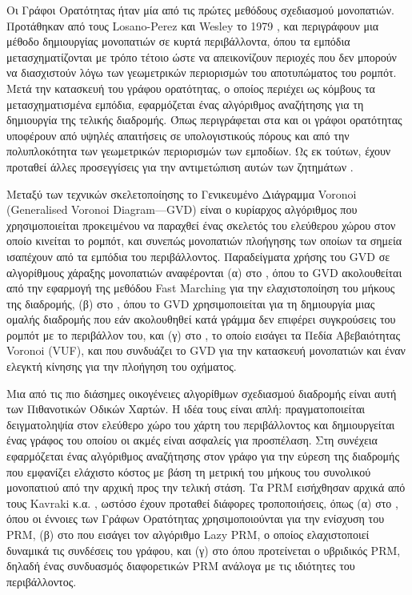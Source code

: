 Οι Γράφοι Ορατότητας ήταν μία από τις πρώτες μεθόδους σχεδιασμού μονοπατιών.
Προτάθηκαν από τους Losano-Perez και Wesley το 1979 \cite{Lozano-Perez1979},
και περιγράφουν μια μέθοδο δημιουργίας μονοπατιών σε κυρτά περιβάλλοντα, όπου
τα εμπόδια μετασχηματίζονται με τρόπο τέτοιο ώστε να απεικονίζουν περιοχές που
δεν μπορούν να διασχιστούν λόγω των γεωμετρικών περιορισμών του αποτυπώματος
του ρομπότ. Μετά την κατασκευή του γράφου ορατότητας, ο οποίος περιέχει ως
κόμβους τα μετασχηματισμένα εμπόδια, εφαρμόζεται ένας αλγόριθμος αναζήτησης για
τη δημιουργία της τελικής διαδρομής. Όπως περιγράφεται στα \cite{Ghosh2007} και
\cite{Ghosh2013} οι γράφοι ορατότητας υποφέρουν από υψηλές απαιτήσεις σε
υπολογιστικούς πόρους και από την πολυπλοκότητα των γεωμετρικών περιορισμών των
εμποδίων. Ως εκ τούτων, έχουν προταθεί άλλες προσεγγίσεις για την αντιμετώπιση
αυτών των ζητημάτων \cite{Kim2011}.

Μεταξύ των τεχνικών σκελετοποίησης το Γενικευμένο Διάγραμμα Voronoi
(Generalised Voronoi Diagram---GVD) είναι ο κυρίαρχος αλγόριθμος που
χρησιμοποιείται προκειμένου να παραχθεί ένας σκελετός του ελεύθερου χώρου στον
οποίο κινείται το ρομπότ, και συνεπώς μονοπατιών πλοήγησης των οποίων τα σημεία
ισαπέχουν από τα εμπόδια του περιβάλλοντος. Παραδείγματα χρήσης του GVD σε
αλγορίθμους χάραξης μονοπατιών αναφέρονται (α) στο \cite{Garrido2006}, όπου το
GVD ακολουθείται από την εφαρμογή της μεθόδου Fast Marching για την
ελαχιστοποίηση του μήκους της διαδρομής, (β) στο \cite{Bhattacharya2007}, όπου
το GVD χρησιμοποιείται για τη δημιουργία μιας ομαλής διαδρομής που εάν
ακολουθηθεί κατά γράμμα δεν επιφέρει συγκρούσεις του ρομπότ με το περιβάλλον
του, και (γ) στο \cite{Ok2013}, το οποίο εισάγει τα Πεδία Αβεβαιότητας Voronoi
(VUF), και που συνδυάζει το GVD για την κατασκευή μονοπατιών και έναν ελεγκτή
κίνησης για την πλοήγηση του οχήματος.

Μια από τις πιο διάσημες οικογένειες αλγορίθμων σχεδιασμού διαδρομής είναι αυτή
των Πιθανοτικών Οδικών Χαρτών. Η ιδέα τους είναι απλή: πραγματοποιείται
δειγματοληψία στον ελεύθερο χώρο του χάρτη του περιβάλλοντος και δημιουργείται
ένας γράφος του οποίου οι ακμές είναι ασφαλείς για προσπέλαση. Στη συνέχεια
εφαρμόζεται ένας αλγόριθμος αναζήτησης στον γράφο για την εύρεση της διαδρομής
που εμφανίζει ελάχιστο κόστος με βάση τη μετρική του μήκους του συνολικού
μονοπατιού από την αρχική προς την τελική στάση. Τα PRM εισήχθησαν αρχικά από
τους Kavraki κ.α. \cite{Kavraki1996}, ωστόσο έχουν προταθεί διάφορες
τροποποιήσεις, όπως (α) στο \cite{Nissoux}, όπου οι έννοιες των Γράφων
Ορατότητας χρησιμοποιούνται για την ενίσχυση του PRM, (β) στο \cite{Bohlin2000}
που εισάγει τον αλγόριθμο Lazy PRM, ο οποίος ελαχιστοποιεί δυναμικά τις
συνδέσεις του γράφου, και (γ) στο \cite{Hsua} όπου προτείνεται ο υβριδικός PRM,
δηλαδή ένας συνδυασμός διαφορετικών PRM ανάλογα με τις ιδιότητες του
περιβάλλοντος.

